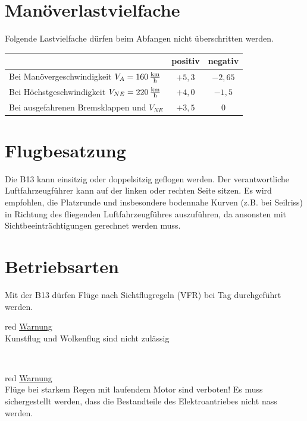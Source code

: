 \section{Manöverlastvielfache}

Folgende Lastvielfache dürfen beim Abfangen nicht überschritten werden.\\
\newline
\begin{tabular}{|l|c|c|}
\hline
& positiv & negativ \\
\hline
Bei Manövergeschwindigkeit $V_A=\unit[160]{\frac{km}{h}}$ & $+5,3$ & $-2,65$\\
\hline
Bei Höchstgeschwindigkeit $V_{NE}=\unit[220]{\frac{km}{h}}$ & $+4,0$ & $-1,5$ \\
\hline
Bei ausgefahrenen Bremsklappen und $V_{NE}$ & $+3,5$ & $0$\\
\hline
\end{tabular}

\section{Flugbesatzung}
Die B13 kann einsitzig oder doppelsitzig geflogen werden. Der verantwortliche Luftfahrzeugführer kann auf der linken oder rechten Seite sitzen. Es wird empfohlen, die Platzrunde und insbesondere bodennahe Kurven (z.B. bei Seilriss) in Richtung des fliegenden Luftfahrzeugführes auszuführen, da ansonsten mit Sichtbeeinträchtigungen gerechnet werden muss.

\section{Betriebsarten}
Mit der B13 dürfen Flüge nach Sichtflugregeln (VFR) bei Tag durchgeführt werden.\\
\newline
\begin{color}{red} \large{\underline{Warnung}}\\
Kunstflug und Wolkenflug sind nicht zulässig
\end{color}\\

\begin{color}{red}
\large{\underline{Warnung}}\\
Flüge bei starkem Regen mit laufendem Motor sind verboten! Es
muss sichergestellt werden, dass die Bestandteile des Elektroantriebes nicht nass werden.
\end{color}\\

